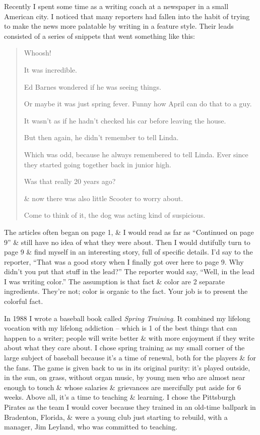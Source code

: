 \documentclass{article}
\begin{document}
Recently I spent some time as a writing coach at a newspaper in a small American city. I noticed that many reporters had fallen into the habit of trying to make the news more palatable by writing in a feature style. Their leads consisted of a series of snippets that went something like this:
\begin{quotation}
	Whoosh!
	
	It was incredible.
	
	Ed Barnes wondered if he was seeing things.
	
	Or maybe it was just spring fever. Funny how April can do that to a guy.
	
	It wasn't as if he hadn't checked his car before leaving the house.
	
	But then again, he didn't remember to tell Linda.
	
	Which was odd, because he always remembered to tell Linda. Ever since they started going together back in junior high.
	
	Was that really 20 years ago?
	
	\& now there was also little Scooter to worry about.
	
	Come to think of it, the dog was acting kind of suspicious.
\end{quotation}
The articles often began on page 1, \& I would read as far as ``Continued on page 9'' \& still have no idea of what they were about. Then I would dutifully turn to page 9 \& find myself in an interesting story, full of specific details. I'd say to the reporter, ``That was a good story when I finally got over here to page 9. Why didn't you put that stuff in the lead?'' The reporter would say, ``Well, in the lead I was writing color.'' The assumption is that fact \& color are 2 separate ingredients. They're not; color is organic to the fact. Your job is to present  the colorful fact.

In 1988 I wrote a baseball book called \textit{Spring Training}. It combined my lifelong vocation with my lifelong addiction -- which is 1 of the best things that can happen to a writer; people will write better \& with more enjoyment if they write about what they care about. I chose spring training as my small corner of the large subject of baseball because it's a time of renewal, both for the players \& for the fans. The game is given back to us in its original purity: it's played outside, in the sun, on grass, without organ music, by young men who are almost near enough to touch \& whose salaries \& grievances are mercifully put aside for 6 weeks. Above all, it's a time to teaching \& learning. I chose the Pittsburgh Pirates as the team I would cover because they trained in an old-time ballpark in Bradenton, Florida, \& were a young club just starting to rebuild, with a manager, Jim Leyland, who was committed to teaching.
\end{document}

